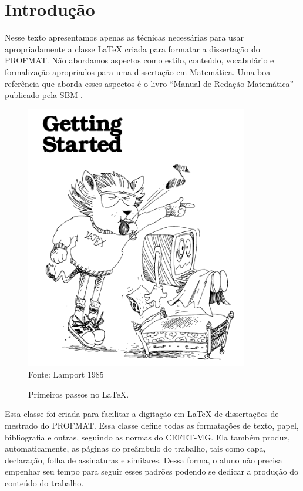 \documentclass[fleqn]{profmat-cefet}
\begin{document}

\listoffigures

\listoftables

\tableofcontents

\chapter{Introdução}
\label{cap:introducao}

Nesse texto apresentamos apenas as técnicas necessárias para usar
apropriadamente a classe \LaTeX{} criada para formatar 
a dissertação do PROFMAT.
Não abordamos aspectos como estilo, conteúdo, vocabulário e formalização 
apropriados para uma dissertação em Matemática. Uma boa referência que 
aborda esses aspectos é o livro ``Manual de Redação Matemática'' publicado
pela SBM \cite{MORAISFILHO:MAN_REDACAO_MAT}.

\begin{figure}
    \centering
    \caption{Primeiros passos no \LaTeX.}
    \label{fig:starting_latex}
    \includegraphics[width=0.4\linewidth]{figs/latex-pet}
    \\ Fonte: Lamport 1985 \cite{LAMPORT:LATEX}
\end{figure}

Essa classe foi criada para facilitar a digitação em \LaTeX{} 
de dissertações de mestrado do PROFMAT.
Essa classe define todas as formatações de texto, papel, bibliografia e outras,
seguindo as normas do CEFET-MG. 
Ela também produz, automaticamente, as páginas do preâmbulo do trabalho, tais 
como capa, declaração, folha de assinaturas e similares. Dessa forma, 
o aluno não precisa empenhar seu tempo para seguir esses padrões podendo 
se dedicar a produção do conteúdo do trabalho.
\end{document}
